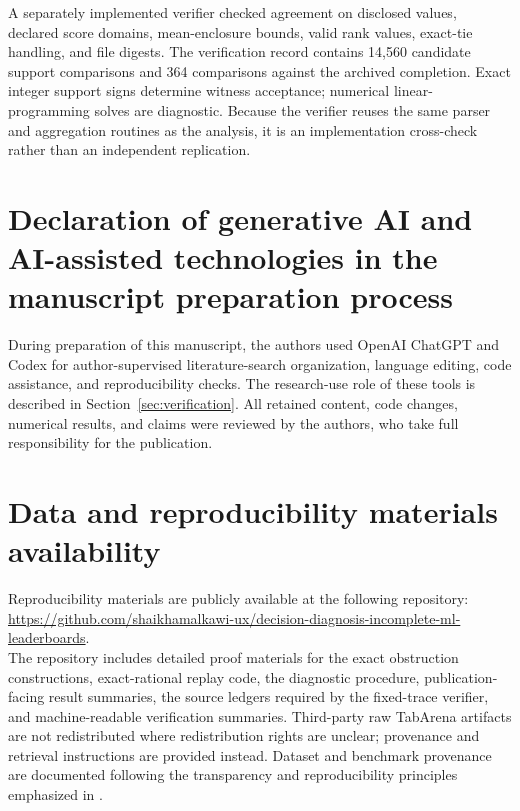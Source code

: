 \documentclass[preprint,11pt]{elsarticle}
\begin{document}
A separately implemented verifier checked agreement on disclosed values, declared score domains, mean-enclosure bounds, valid rank values, exact-tie handling, and file digests. The verification record contains 14,560 candidate support comparisons and 364 comparisons against the archived completion. Exact integer support signs determine witness acceptance; numerical linear-programming solves are diagnostic. Because the verifier reuses the same parser and aggregation routines as the analysis, it is an implementation cross-check rather than an independent replication.


\section*{Declaration of generative AI and AI-assisted technologies in the manuscript preparation process}
During preparation of this manuscript, the authors used OpenAI ChatGPT and Codex for author-supervised literature-search organization, language editing, code assistance, and reproducibility checks. The research-use role of these tools is described in Section~\ref{sec:verification}. All retained content, code changes, numerical results, and claims were reviewed by the authors, who take full responsibility for the publication.

\section*{Data and reproducibility materials availability}
Reproducibility materials are publicly available at the following repository:\\
\url{https://github.com/shaikhamalkawi-ux/decision-diagnosis-incomplete-ml-leaderboards}.\\
The repository includes detailed proof materials for the exact obstruction constructions, exact-rational replay code, the diagnostic procedure, publication-facing result summaries, the source ledgers required by the fixed-trace verifier, and machine-readable verification summaries. Third-party raw TabArena artifacts are not redistributed where redistribution rights are unclear; provenance and retrieval instructions are provided instead. Dataset and benchmark provenance are documented following the transparency and reproducibility principles emphasized in \cite{r25,r26}.
\end{document}
